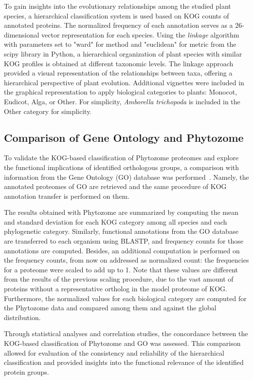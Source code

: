 To gain insights into the evolutionary relationships among 
the studied plant species, a hierarchical classification 
system is used based on KOG counts of annotated proteins. 
The normalized frequency of each annotation serves as a 
26-dimensional vector representation for each species. Using 
the \emph{linkage} algorithm with parameters set to "ward" 
for method and "euclidean" for metric from the scipy library 
in Python, a hierarchical organization of plant species with 
similar KOG profiles is obtained at different taxonomic 
levels. The linkage approach provided a visual representation 
of the relationships between taxa, offering a hierarchical 
perspective of plant evolution. Additional vignettes were 
included in the graphical representation to apply biological 
categories to plants: Monocot, Eudicot, Alga, or Other. 
For simplicity, \emph{Amborella trichopoda} is included in 
the Other category for simplicity.


\subsection{Comparison of Gene Ontology and Phytozome}
\label{sec:method.compare}

To validate the KOG-based classification of Phytozome proteomes 
and explore the functional implications of identified 
orthologous groups, a 
comparison with information from the Gene Ontology (GO) 
database was performed~\citep{ashburner2000,consortium2023}.
Namely, the annotated proteomes of GO are retrieved and the 
same procedure of KOG annotation transfer is performed on them.

The results obtained with Phytozome are summarized by 
computing the mean and standard deviation for each KOG 
category among all species and each phylogenetic category. 
Similarly, functional annotations from the GO database are 
transferred to each organism using BLASTP, and frequency 
counts for those annotations are computed. Besides, an 
additional computation is performed on the frequency counts, 
from now on addressed as normalized count: the frequencies 
for a proteome were scaled to add up to 1. Note that these 
values are different from the results of the previous 
scaling procedure, due to the vast amount of proteins 
without a representative ortholog in the model proteome 
of KOG. Furthermore, the normalized values for each 
biological category are computed for the Phytozome data and
compared among them and against the global distribution.

Through statistical analyses and correlation studies, the 
concordance between the KOG-based classification of Phytozome 
and GO was assessed. This comparison allowed for 
evaluation of the consistency and reliability of the 
hierarchical classification and provided insights into the 
functional relevance of the identified protein groups.

